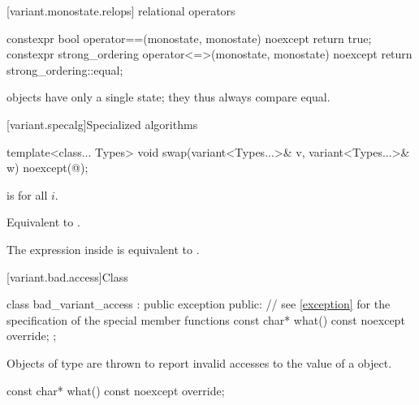 [variant.monostate.relops]{ relational operators}

%
%
\begin{itemdecl}
constexpr bool operator==(monostate, monostate) noexcept { return true; }
constexpr strong_ordering operator<=>(monostate, monostate) noexcept
{ return strong_ordering::equal; }
\end{itemdecl}

\begin{itemdescr}
\pnum
\begin{note}
 objects have only a single state; they thus always compare equal.
\end{note}
\end{itemdescr}

[variant.specalg]{Specialized algorithms}

%
\begin{itemdecl}
template<class... Types>
  void swap(variant<Types...>& v, variant<Types...>& w) noexcept(@\seebelow@);
\end{itemdecl}

\begin{itemdescr}
\pnum
\constraints
{}
is  for all $i$.

\pnum
\effects
Equivalent to .

\pnum
\remarks
The expression inside  is equivalent to .
\end{itemdescr}

%
[variant.bad.access]{Class }

\begin{codeblock}
class bad_variant_access : public exception {
public:
  // see \ref{exception} for the specification of the special member functions
  const char* what() const noexcept override;
};
\end{codeblock}

\pnum
Objects of type  are thrown to report invalid
accesses to the value of a  object.

%
\begin{itemdecl}
const char* what() const noexcept override;
\end{itemdecl}

